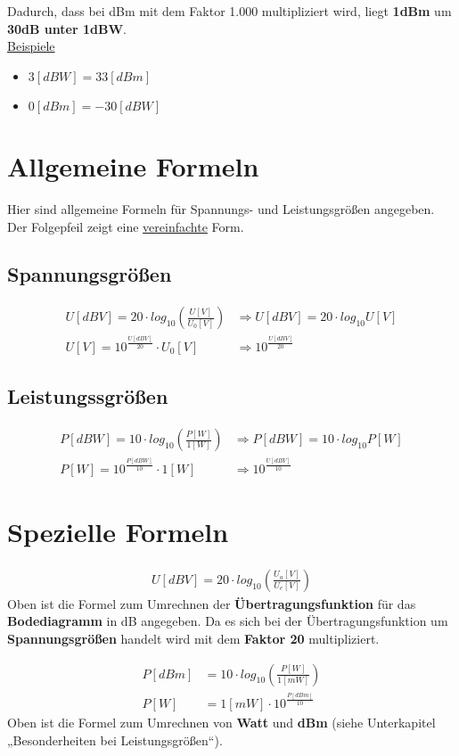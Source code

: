 Dadurch, dass bei dBm mit dem Faktor 1.000 multipliziert wird, liegt \textbf{1dBm} um \textbf{30dB unter 1dBW}.\\ 

\underline{Beispiele}
\begin{itemize}
    \item $3[dBW] = 33[dBm]$
    \item $0[dBm] = -30[dBW]$
\end{itemize}

\section{Allgemeine Formeln}
Hier sind allgemeine Formeln für Spannungs- und Leistungsgrößen angegeben. Der Folgepfeil zeigt eine \underline{vereinfachte} Form.

\subsection{Spannungsgrößen}
\begin{align}
    U[dBV]=20\cdot log_{10}(\frac{U[V]}{U_0[V]}) &\Rightarrow U[dBV]=20\cdot log_{10} U[V] \\
    U[V]=10^{\frac{U[dBV]}{20}}\cdot U_0[V] &\Rightarrow 10^{\frac{U[dBV]}{20}}
\end{align}

\subsection{Leistungssgrößen}
\begin{align}
    P[dBW]=10\cdot log_{10}(\frac{P[W]}{1[W]}) &\Rightarrow P[dBW]=10\cdot log_{10} P[W] \\
    P[W]=10^{\frac{P[dBW]}{10}}\cdot 1[W] &\Rightarrow 10^{\frac{U[dBV]}{10}}
\end{align}

\section{Spezielle Formeln}
\begin{align}
    U[dBV]=20\cdot log_{10}(\frac{U_a[V]}{U_e[V]})
\end{align}
Oben ist die Formel zum Umrechnen der \textbf{Übertragungsfunktion} für das \textbf{Bodediagramm} in dB angegeben. Da es sich bei der Übertragungsfunktion um \textbf{Spannungsgrößen} handelt wird mit dem \textbf{Faktor 20} multipliziert.

\begin{align}
    P[dBm]&=10\cdot log_{10}(\frac{P[W]}{1[mW]}) \\
    P[W]&=1[mW]\cdot 10^{\frac{P[dBm]}{10}}
\end{align}
Oben ist die Formel zum Umrechnen von \textbf{Watt} und \textbf{dBm} (siehe Unterkapitel „Besonderheiten bei Leistungsgrößen“).

